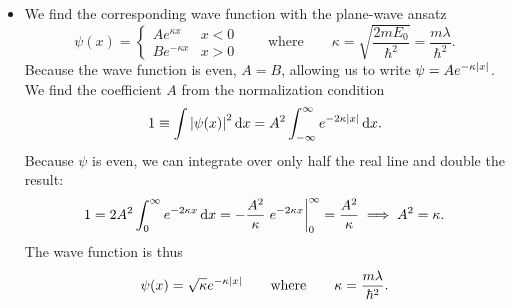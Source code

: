 \documentclass[11pt, a4paper]{article}
\newcommand{\diff}{\mathop{}\!\mathrm{d}} %
\newcommand{\eqtext}[1]{\qquad \text{#1} \qquad}
\begin{document}
\begin{itemize}
	\item We find the corresponding wave function with the plane-wave ansatz
	\begin{equation*}
		\psi(x) =
		\begin{cases}
			A e^{\kappa x} & x < 0\\
			B e^{-\kappa x} & x > 0
		\end{cases}
		\eqtext{where} \kappa = \sqrt{\frac{2mE_{0}}{\hbar^{2}}} = \frac{m\lambda}{\hbar^{2}}.
	\end{equation*}
	Because the wave function is even, $ A = B $, allowing us to write $ \psi = Ae^{-\kappa \abs{x}} $. We find the coefficient $ A $ from the normalization condition
	\begin{equation*}
		1 \equiv \int \abs{\psi(x)}^{2} \diff x = A^{2} \int_{-\infty}^{\infty} e^{-2\kappa \abs{x}} \diff x.
	\end{equation*}
	Because $ \psi $ is even, we can integrate over only half the real line and double the result:
	\begin{equation*}
		1 = 2A^{2} \int_{0}^{\infty} e^{-2\kappa x} \diff x = - \frac{A^{2}}{\kappa} \eval{e^{-2\kappa x}}_{0}^{\infty} = \frac{A^{2}}{\kappa} \implies A^{2} = \kappa.
	\end{equation*}
	The wave function is thus
	\begin{equation*}
		\psi(x) = \sqrt{\kappa} e^{-\kappa \abs{x}} \eqtext{where} \kappa = \frac{m\lambda}{\hbar^{2}}.
	\end{equation*}
	
\end{itemize}
\end{document}
